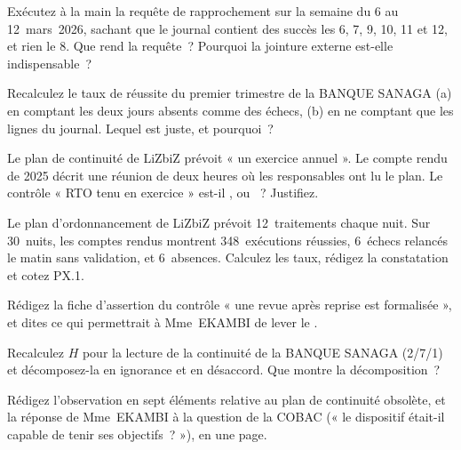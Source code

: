 \begin{boxexo}[title={\ding{45}\quad Exercice~23.3. Le rapprochement \niveaumoyen}]
Exécutez à la main la requête de rapprochement sur la semaine du 6 au
12~mars~2026, sachant que le journal contient des succès les 6, 7, 9, 10,
11 et 12, et rien le 8. Que rend la requête~? Pourquoi la jointure externe
est-elle indispensable~?
\end{boxexo}

\begin{boxexo}[title={\ding{45}\quad Exercice~23.4. Le taux de réussite \niveaubase}]
Recalculez le taux de réussite du premier trimestre de la BANQUE SANAGA
(a) en comptant les deux jours absents comme des échecs, (b) en ne
comptant que les lignes du journal. Lequel est juste, et pourquoi~?
\end{boxexo}

\begin{boxexo}[title={\ding{45}\quad Exercice~23.5. Quel exercice~? \niveaumoyen}]
Le plan de continuité de LiZbiZ prévoit « un exercice annuel ». Le compte
rendu de 2025 décrit une réunion de deux heures où les responsables ont lu
le plan. Le contrôle « RTO tenu en exercice » est-il \OUI{}, \NON{} ou
\NEK{}~? Justifiez.
\end{boxexo}

\begin{boxexo}[title={\ding{45}\quad Exercice~23.6. Les traitements de nuit \niveaumoyen}]
Le plan d'ordonnancement de LiZbiZ prévoit 12~traitements chaque nuit. Sur
30~nuits, les comptes rendus montrent 348~exécutions réussies, 6~échecs
relancés le matin sans validation, et 6~absences. Calculez les taux,
rédigez la constatation et cotez PX.1.
\end{boxexo}

\begin{boxexo}[title={\ding{45}\quad Exercice~23.7. La revue après incident \niveaumoyen}]
Rédigez la fiche d'assertion du contrôle « une revue après reprise est
formalisée », et dites ce qui permettrait à Mme~EKAMBI de lever le \NEK{}.
\end{boxexo}

\begin{boxexo}[title={\ding{45}\quad Exercice~23.8. Les dix contrôles \niveaumoyen}]
Recalculez $H$ pour la lecture de la continuité de la BANQUE SANAGA (2/7/1)
et décomposez-la en ignorance et en désaccord. Que montre la
décomposition~?
\end{boxexo}

\begin{boxexo}[title={\ding{45}\quad Exercice~23.9. Le rapport à la COBAC \niveauexpert}]
Rédigez l'observation en sept éléments relative au plan de continuité
obsolète, et la réponse de Mme~EKAMBI à la question de la COBAC (« le
dispositif était-il capable de tenir ses objectifs~? »), en une page.
\end{boxexo}

